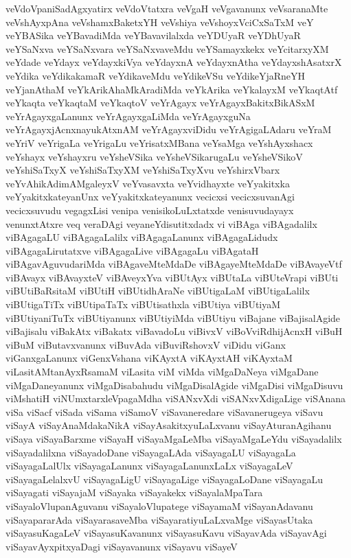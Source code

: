 {veVdoVpaniSadAgxyatirx
veVdoVtatxra
veVgaH
veVgavanunx
veVsaranaMte
veVshAyxpAna
veVshamxBaketxYH
veVshiya
veVshoyxVciCxSaTxM
veY
veYBASika
veYBavadiMda
veYBavavilalxda
veYDUyaR
veYDhUyaR
veYSaNxva
veYSaNxvara
veYSaNxvaveMdu
veYSamayxkekx
veYcitarxyXM
veYdade
veYdayx
veYdayxkiVya
veYdayxnA
veYdayxnAtha
veYdayxshAsatxrX
veYdika
veYdikakamaR
veYdikaveMdu
veYdikeVSu
veYdikeYjaRneYH
veYjanAthaM
veYkArikAhaMkAradiMda
veYkArika
veYkalayxM
veYkaqtAtf
veYkaqta
veYkaqtaM
veYkaqtoV
veYrAgayx
veYrAgayxBakitxBikASxM
veYrAgayxgaLanunx
veYrAgayxgaLiMda
veYrAgayxguNa
veYrAgayxjAcnxnayukAtxnAM
veYrAgayxviDidu
veYrAgigaLAdaru
veYraM
veYriV
veYrigaLa
veYrigaLu
veYrisatxMBana
veYsaMga
veYshAyxshacx
veYshayx
veYshayxru
veYsheVSika
veYsheVSikarugaLu
veYsheVSikoV
veYshiSaTxyX
veYshiSaTxyXM
veYshiSaTxyXvu
veYshirxVbarx
veYvAhikAdimAMgaleyxV
veYvasavxta
veYvidhayxte
veYyakitxka
veYyakitxkateyanUnx
veYyakitxkateyanunx
vecicxsi
vecicxsuvanAgi
vecicxsuvudu
vegagxLisi
venipa
venisikoLuLxtatxde
venisuvudayayx
venunxtAtxre
veq
veraDAgi
veyaneYdisutitxdadx
vi
viBAga
viBAgadalilx
viBAgagaLU
viBAgagaLalilx
viBAgagaLanunx
viBAgagaLidudx
viBAgagaLirutatxve
viBAgagaLive
viBAgagaLu
viBAgataH
viBAgavAguvudariMda
viBAgaveMteMdaDe
viBAgayeMteMdaDe
viBAvayeVtf
viBAvayx
viBAvayxteV
viBAveyxYva
viBUtAyx
viBUtaLa
viBUteVrapi
viBUti
viBUtiBaRsitaM
viBUtiH
viBUtidhAraNe
viBUtigaLaM
viBUtigaLalilx
viBUtigaTiTx
viBUtipaTaTx
viBUtisathxla
viBUtiya
viBUtiyaM
viBUtiyaniTuTx
viBUtiyanunx
viBUtiyiMda
viBUtiyu
viBajane
viBajisalAgide
viBajisalu
viBakAtx
viBakatx
viBavadoLu
viBivxV
viBoVviRdhijAcnxH
viBuH
viBuM
viButavxvanunx
viBuvAda
viBuviRshovxV
viDidu
viGanx
viGanxgaLanunx
viGenxVshana
viKAyxtA
viKAyxtAH
viKAyxtaM
viLasitAMtanAyxRsamaM
viLasita
viM
viMda
viMgaDaNeya
viMgaDane
viMgaDaneyanunx
viMgaDisabahudu
viMgaDisalAgide
viMgaDisi
viMgaDisuvu
viMshatiH
viNUmxtarxleVpagaMdha
viSANxvXdi
viSANxvXdigaLige
viSAnana
viSa
viSacf
viSada
viSama
viSamoV
viSavaneredare
viSavanerugeya
viSavu
viSayA
viSayAnaMdakaNikA
viSayAsakitxyuLaLxvanu
viSayAturanAgihanu
viSaya
viSayaBarxme
viSayaH
viSayaMgaLeMba
viSayaMgaLeYdu
viSayadalilx
viSayadalilxna
viSayadoDane
viSayagaLAda
viSayagaLU
viSayagaLa
viSayagaLalUlx
viSayagaLanunx
viSayagaLanunxLaLx
viSayagaLeV
viSayagaLelalxvU
viSayagaLigU
viSayagaLige
viSayagaLoDane
viSayagaLu
viSayagati
viSayajaM
viSayaka
viSayakekx
viSayalaMpaTara
viSayaloVlupanAguvanu
viSayaloVlupatege
viSayamaM
viSayanAdavanu
viSayapararAda
viSayarasaveMba
viSayaratiyuLaLxvaMge
viSayasUtaka
viSayasuKagaLeV
viSayasuKavanunx
viSayasuKavu
viSayavAda
viSayavAgi
viSayavAyxpitxyaDagi
viSayavanunx
viSayavu
viSayeV
}

